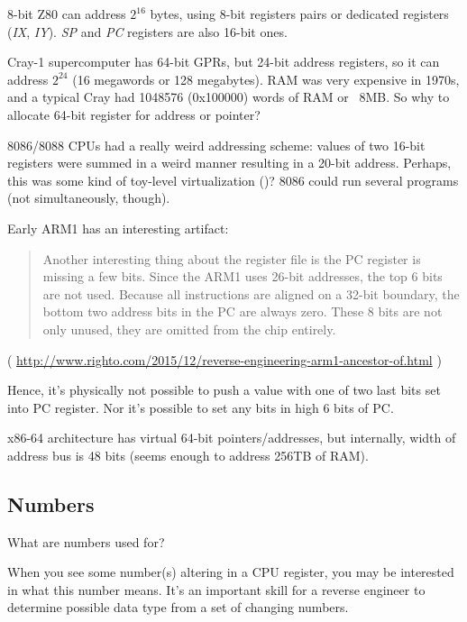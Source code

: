 8-bit Z80 can address $2^{16}$ bytes, using 8-bit registers pairs or dedicated registers (\emph{IX}, \emph{IY}).
\emph{SP} and \emph{PC} registers are also 16-bit ones.

Cray-1 supercomputer has 64-bit GPRs, but 24-bit address registers, so it can address $2^{24}$ 
(16 megawords or 128 megabytes).
RAM was very expensive in 1970s, and a typical Cray had 1048576 (0x100000) words of RAM or ~8MB.
So why to allocate 64-bit register for address or pointer?

8086/8088 CPUs had a really weird addressing scheme:
values of two 16-bit registers were summed in a weird manner resulting in a 20-bit address.
Perhaps, this was some kind of toy-level virtualization ()?
8086 could run several programs (not simultaneously, though).

Early ARM1 has an interesting artifact:

\begin{framed}
\begin{quotation}
Another interesting thing about the register file is the PC register is missing a few bits. Since the ARM1 uses 26-bit addresses, the top 6 bits are not used. Because all instructions are aligned on a 32-bit boundary, the bottom two address bits in the PC are always zero. These 8 bits are not only unused, they are omitted from the chip entirely.
\end{quotation}
\end{framed}

( \url{http://www.righto.com/2015/12/reverse-engineering-arm1-ancestor-of.html} )

Hence, it's physically not possible to push a value with one of two last bits set into PC register.
Nor it's possible to set any bits in high 6 bits of PC.

x86-64 architecture has virtual 64-bit pointers/addresses, but internally, width of address bus is 48 bits
(seems enough to address 256TB of \ac{RAM}).

\subsection{Numbers}

What are numbers used for?

When you see some number(s) altering in a CPU register, you may be interested in what this number means.
It's an important skill for a reverse engineer to determine possible data type from a set of changing numbers.

